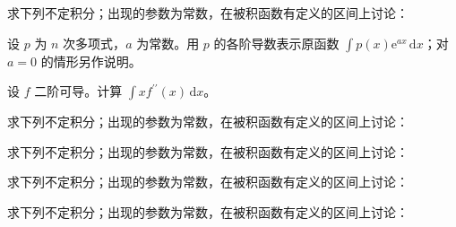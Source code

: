 \newpage
\noindent\begin{minipage}{\textwidth}
求下列不定积分；出现的参数为常数，在被积函数有定义的区间上讨论：
\end{minipage}\par\vfill
\noindent\begin{minipage}{\textwidth}
设 $p$ 为 $n$ 次多项式，$a$ 为常数。用 $p$ 的各阶导数表示原函数 $\int p(x)\mathrm e^{ax}\,\mathrm dx$；对 $a=0$ 的情形另作说明。
\end{minipage}\par\vfill
\noindent\begin{minipage}{\textwidth}
设 $f$ 二阶可导。计算 $\int xf^{\prime\prime}(x)\,\mathrm dx$。
\end{minipage}\par\vfill
\newpage
\noindent\begin{minipage}{\textwidth}
求下列不定积分；出现的参数为常数，在被积函数有定义的区间上讨论：
\end{minipage}\par\vfill
\noindent\begin{minipage}{\textwidth}
求下列不定积分；出现的参数为常数，在被积函数有定义的区间上讨论：
\end{minipage}\par\vfill
\noindent\begin{minipage}{\textwidth}
求下列不定积分；出现的参数为常数，在被积函数有定义的区间上讨论：
\end{minipage}\par\vfill
\newpage
\noindent\begin{minipage}{\textwidth}
求下列不定积分；出现的参数为常数，在被积函数有定义的区间上讨论：
\end{minipage}\par\vfill
